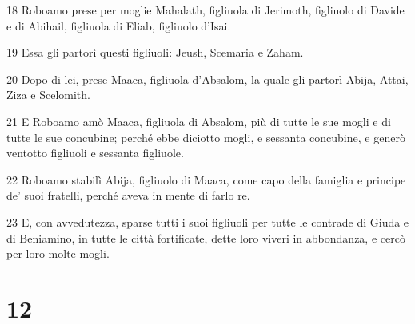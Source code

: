 \par 18 Roboamo prese per moglie Mahalath, figliuola di Jerimoth, figliuolo di Davide e di Abihail, figliuola di Eliab, figliuolo d'Isai.
\par 19 Essa gli partorì questi figliuoli: Jeush, Scemaria e Zaham.
\par 20 Dopo di lei, prese Maaca, figliuola d'Absalom, la quale gli partorì Abija, Attai, Ziza e Scelomith.
\par 21 E Roboamo amò Maaca, figliuola di Absalom, più di tutte le sue mogli e di tutte le sue concubine; perché ebbe diciotto mogli, e sessanta concubine, e generò ventotto figliuoli e sessanta figliuole.
\par 22 Roboamo stabilì Abija, figliuolo di Maaca, come capo della famiglia e principe de' suoi fratelli, perché aveva in mente di farlo re.
\par 23 E, con avvedutezza, sparse tutti i suoi figliuoli per tutte le contrade di Giuda e di Beniamino, in tutte le città fortificate, dette loro viveri in abbondanza, e cercò per loro molte mogli.

\chapter{12}

